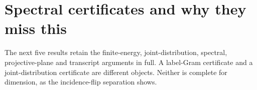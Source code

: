 \documentclass[11pt]{article}
\newcommand{\1}{\mathbf 1}
\begin{document}





\section{Spectral certificates and why they miss this}\label{sec:retained}
The next five results retain the finite-energy, joint-distribution, spectral, projective-plane and transcript arguments in full. A label-Gram certificate and a joint-distribution certificate are different objects. Neither is complete for dimension, as the incidence-flip separation shows.







\clearpage
\appendix






\end{document}
